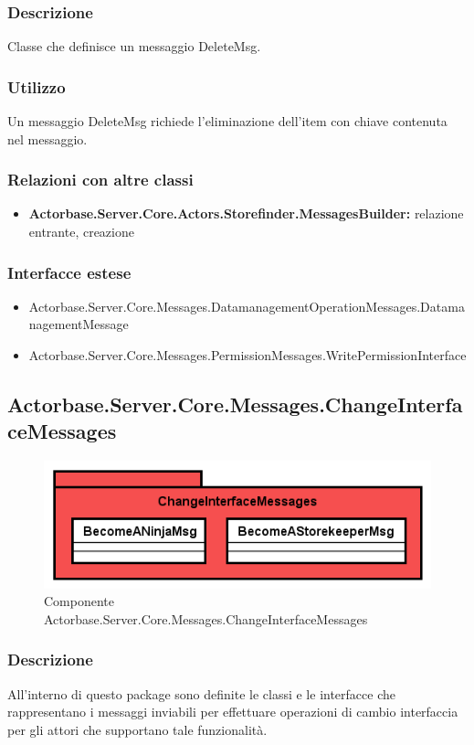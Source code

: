 \documentclass[a4paper]{article}
\begin{document}
			\subsubsection{Descrizione}
				Classe che definisce un messaggio DeleteMsg.
			\subsubsection{Utilizzo}
				Un messaggio DeleteMsg richiede l'eliminazione dell'item con chiave contenuta nel messaggio.
			\subsubsection{Relazioni con altre classi}
			\begin{itemize}
				\item \textbf{Actorbase.Server.Core.Actors.Storefinder.MessagesBuilder:} relazione entrante, creazione
			\end{itemize}
			\subsubsection{Interfacce estese}
			\begin{itemize}
				\item Actorbase.Server.Core.Messages.DatamanagementOperationMessages.DatamanagementMessage
				\item Actorbase.Server.Core.Messages.PermissionMessages.WritePermissionInterface
			\end{itemize}
			
			\subsection{Actorbase.Server.Core.Messages.ChangeInterfaceMessages}
			\begin{figure} [H]
			\centering
			\includegraphics[scale=0.65]{Server/Package/ChangeInterfaceMessagesLevel.png}
			\caption{Componente Actorbase.Server.Core.Messages.ChangeInterfaceMessages}
			\end{figure}
			\subsubsection{Descrizione}
				All'interno di questo package sono definite le classi e le interfacce che rappresentano i messaggi inviabili per effettuare operazioni di cambio interfaccia per gli attori che supportano tale funzionalità.
\end{document}

